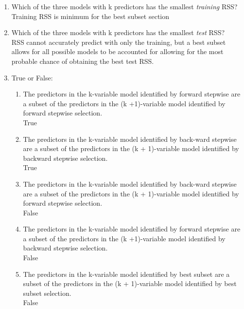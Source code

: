 \documentclass[12pt]{article}
\newcommand\tab[1][1cm]{\hspace*{#1}}
\begin{document}
\medspace

\begin{enumerate}
    \item Which of the three models with k predictors has the smallest \emph{training} RSS?\\
          Training RSS is minimum for the best subset section
    \item Which of the three models with k predictors has the smallest \emph{test} RSS?\\
          RSS cannot accurately predict with only the training, but a best subset allows for all possible models to be accounted for allowing for the most probable chance of obtaining the best test RSS.
    \item True or False:
          \begin{enumerate}[label=(\roman*)]
              \item The predictors in the k-variable model identified by forward stepwise are a subset of the predictors in the (k +1)-variable model identified by forward stepwise selection.\\
                    True \tab
              \item The predictors in the k-variable model identified by back-ward stepwise are a subset of the predictors in the (k + 1)-variable model identified by backward stepwise selection.\\
                    True
              \item The predictors in the k-variable model identified by back-ward stepwise are a subset of the predictors in the (k + 1)-variable model identified by forward stepwise selection.\\
                    False
              \item The predictors in the k-variable model identified by forward stepwise are a subset of the predictors in the (k +1)-variable model identified by backward stepwise selection.\\
                    False
              \item The predictors in the k-variable model identified by best subset are a subset of the predictors in the (k + 1)-variable model identified by best subset selection.\\
                    False
          \end{enumerate}
\end{enumerate}

\end{document}
